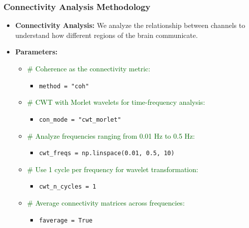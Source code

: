 \documentclass{beamer}
\begin{document}
\begin{frame}
    \frametitle{Connectivity Analysis Methodology}
    \begin{itemize}
        \item \textbf{Connectivity Analysis:} We analyze the relationship between channels to understand how different regions of the brain communicate.
        \item \textbf{Parameters:}
            \begin{itemize}
                \item \textcolor{darkgreen}{\# Coherence as the connectivity metric:}
                \begin{itemize}
                    \item \texttt{method = "coh"}
                \end{itemize}
                \item \textcolor{darkgreen}{\# CWT with Morlet wavelets for time-frequency analysis:}
                \begin{itemize}
                    \item \texttt{con\_mode = "cwt\_morlet"}
                \end{itemize}
                \item \textcolor{darkgreen}{\# Analyze frequencies ranging from 0.01 Hz to 0.5 Hz:}
                \begin{itemize}
                    \item \texttt{cwt\_freqs = np.linspace(0.01, 0.5, 10)}
                \end{itemize}
                \item \textcolor{darkgreen}{\# Use 1 cycle per frequency for wavelet transformation:}
                \begin{itemize}
                    \item \texttt{cwt\_n\_cycles = 1}
                \end{itemize}
                \item \textcolor{darkgreen}{\# Average connectivity matrices across frequencies:}
                \begin{itemize}
                    \item \texttt{faverage = True}
                \end{itemize}
            \end{itemize}
    \end{itemize}
\end{frame}
\end{document}

